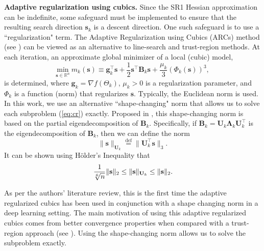 \noindent \textbf{Adaptive regularization using cubics.} 
 Since the SR1 Hessian approximation can be indefinite, some safeguard must be implemented to ensure that the resulting search direction $\mathbf{s}_k$ is a descent direction.  One such safeguard is to use a ``regularization" term.
The Adaptive Regularization using Cubics (ARCs) method (see \citet{Griewank1981,NesP06,cartis2011adaptive}) can be viewed as an alternative to line-search and trust-region methods. At each iteration, an approximate global minimizer of a local (cubic) model,
\begin{equation}\label{eq:cr}
	\underset{\mathbf{s}\in \mathbb{R}^n}{\text{min}}  \ m_k(\mathbf{s}) 
	\equiv 
	\mathbf{g}_k^{\top}\mathbf{s}
	+ \frac{1}{2} \mathbf{s}^{\top}\mathbf{B}_k \mathbf{s} + \frac{\mu_k}{3} (\Phi_k(\mathbf{s}))^3,
\end{equation}
is determined, where  $\mathbf{g}_k = \nabla f(\Theta_k)$, $\mu_k > 0$ is a regularization parameter, and
$\Phi_k$ is a function (norm) that regularizes $\mathbf{s}$.   Typically, the Euclidean norm is used.
In this work, we use an alternative ``shape-changing" norm that allows us to solve each subproblem 
(\ref{eq:cr}) exactly.  Proposed in \citet{Burdakov2017}, this shape-changing norm is
based on the partial eigendecomposition of $\mathbf{B}_{k}$.  Specifically, if 
$\mathbf{B}_{k} = \mathbf{U}_k \mathbf{\Lambda}_k \mathbf{U}_k^{\top}$ is the eigendecomposition
of $\mathbf{B}_k$, then we can define the norm 
$$
 \|\mathbf{s}\|_{\mathbf{U}_k}\overset{\text{def}}{=}\|\mathbf{U}_k^\top \mathbf{s}\|_3.
 $$
 It can be shown using H\"{o}lder's Inequality that 
 $$
 \frac{1}{\sqrt[\leftroot{1} 6]{n}}
 \| \mathbf{s} \|_2 
\le  \| \mathbf{s} \|_{\mathbf{U}_k}
\le  \| \mathbf{s} \|_2.
$$

As per the authors' literature review, this is the first time the adaptive regularized cubics has been used in conjunction with a shape changing norm in a deep learning setting. The main motivation of using this adaptive regularized cubics comes from better convergence properties when compared with a trust-region approach (see \citet{cartis2011adaptive}). Using the shape-changing norm allows us to solve the subproblem exactly.
 
